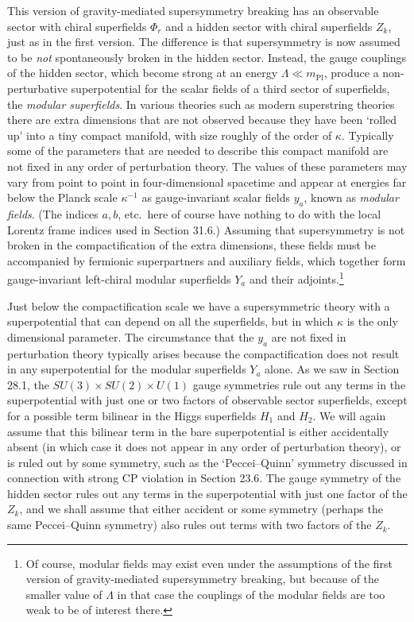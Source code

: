This version of gravity-mediated supersymmetry breaking has an observable
sector with chiral superfields \(\Phi_r\) and a hidden sector with chiral
superfields \(Z_k\), just as in the first version. The difference is that
supersymmetry is now assumed to be \emph{not} spontaneously broken in the
hidden sector. Instead, the gauge couplings of the hidden sector, which
become strong at an energy \(\Lambda\ll m_{\mathrm{Pl}}\), produce a
non-perturbative superpotential for the scalar fields of a third sector of
superfields, the \emph{modular superfields}. In various theories such as
modern superstring theories there are extra dimensions that are not
observed because they have been `rolled up' into a tiny compact manifold,
with size roughly of the order of \(\kappa\). Typically some of the
parameters that are needed to describe this compact manifold are not fixed
in any order of perturbation theory. The values of these parameters may
vary from point to point in four-dimensional spacetime and appear at
energies far below the Planck scale \(\kappa^{-1}\) as gauge-invariant scalar
fields \(y_a\), known as \emph{modular fields}. (The indices \(a,b\), etc.\
here of course have nothing to do with the local Lorentz frame indices used
in Section 31.6.) Assuming that supersymmetry is not broken in the
compactification of the extra dimensions, these fields must be accompanied
by fermionic superpartners and auxiliary fields, which together form
gauge-invariant left-chiral modular superfields \(Y_a\) and their
adjoints.\footnote{Of course, modular fields may exist even under the
assumptions of the first version of gravity-mediated supersymmetry breaking,
but because of the smaller value of \(\Lambda\) in that case the couplings
of the modular fields are too weak to be of interest there.}

Just below the compactification scale we have a supersymmetric theory with a
superpotential that can depend on all the superfields, but in which
\(\kappa\) is the only dimensional parameter. The circumstance that the
\(y_a\) are not fixed in perturbation theory typically arises because the
compactification does not result in any superpotential for the modular
superfields \(Y_a\) alone. As we saw in Section 28.1, the
\(SU(3)\times SU(2)\times U(1)\) gauge symmetries rule out any terms in the
superpotential with just one or two factors of observable sector
superfields, except for a possible term bilinear in the Higgs superfields
\(H_1\) and \(H_2\). We will again assume that this bilinear term in the
bare superpotential is either accidentally absent (in which case it does not
appear in any order of perturbation theory), or is ruled out by some
symmetry, such as the `Peccei--Quinn' symmetry discussed in connection with
strong CP violation in Section 23.6. The gauge symmetry of the hidden sector
rules out any terms in the superpotential with just one factor of the
\(Z_k\), and we shall assume that either accident or some symmetry (perhaps
the same Peccei--Quinn symmetry) also rules out terms with two factors of
the \(Z_k\).


